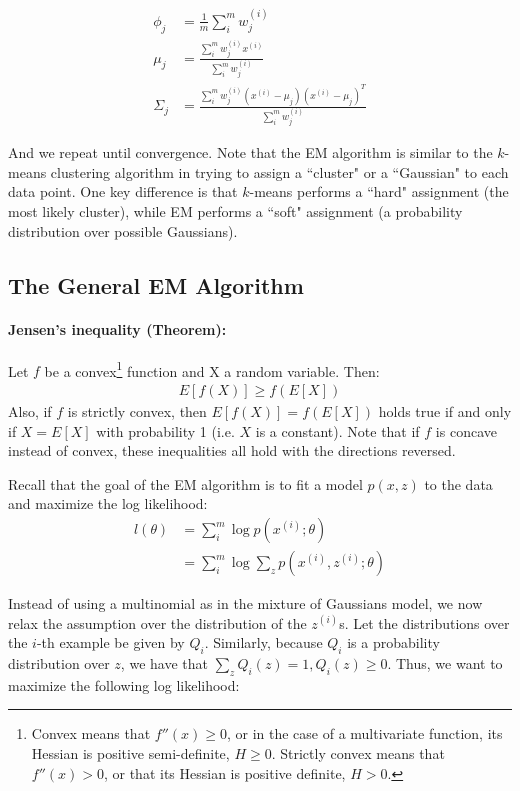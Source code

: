 \documentclass[letterpaper,10pt]{article}
\begin{document}
\begin{align}
\phi_j &= \frac{1}{m} \sum_i^m w_j^{(i)} \\
\mu_j &= \frac{\sum_i^m w_j^{(i)} x^{(i)} }{\sum_i^m w_j^{(i)} } \\
\Sigma_j &= \frac{\sum_i^m w_j^{(i)} (x^{(i)} - \mu_j) (x^{(i)} - \mu_j)^T }{\sum_i^m w_j^{(i)} }
\end{align}

And we repeat until convergence. Note that the EM algorithm is similar to the $k$-means clustering algorithm in trying to assign a ``cluster" or a ``Gaussian" to each data point. One key difference is that $k$-means performs a ``hard" assignment (the most likely cluster), while EM performs a ``soft" assignment (a probability distribution over possible Gaussians).


\subsection{The General EM Algorithm}

\paragraph{Jensen's inequality (Theorem):} Let $f$ be a convex\footnote{Convex means that $f''(x)\geq0$, or in the case of a multivariate function, its Hessian is positive semi-definite, $H \geq 0$. Strictly convex means that $f''(x) > 0$, or that its Hessian is positive definite, $H>0$.} function and X a random variable. Then: 
\begin{align}
E[f(X)] \geq f(E[X])
\end{align}
Also, if $f$ is strictly convex, then $E[f(X)] = f(E[X])$ holds true if and only if $X = E[X]$ with probability 1 (i.e. $X$ is a constant). Note that if $f$ is concave instead of convex, these inequalities all hold with the directions reversed.


Recall that the goal of the EM algorithm is to fit a model $p(x,z)$ to the data and maximize the log likelihood:
\begin{align}
l(\theta) &= \sum_i^m \log p(x^{(i)}; \theta) \\
&= \sum_i^m \log \sum_z p(x^{(i)}, z^{(i)}; \theta) 
\end{align}

Instead of using a multinomial as in the mixture of Gaussians model, we now relax the assumption over the distribution of the $z^{(i)}$s. Let the distributions over the $i$-th example be given by $Q_i$. Similarly, because $Q_i$ is a probability distribution over $z$, we have that $\sum_z Q_i(z) = 1, Q_i(z) \geq 0$. Thus, we want to maximize the following log likelihood:
\end{document}
